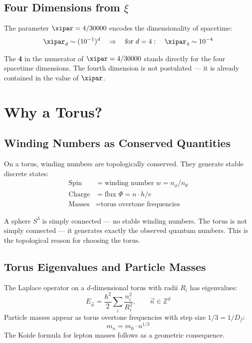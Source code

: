 \subsection{Four Dimensions from \texorpdfstring{$\xi$}{xi}}

The parameter $\xipar = 4/30000$ encodes the dimensionality of spacetime:
\begin{equation}
	\xipar_d \sim (10^{-1})^d \quad \Rightarrow \quad \text{for } d=4: \quad \xipar_4 \sim 10^{-4}
\end{equation}

\begin{keyresult}
The \textbf{4} in the numerator of $\xipar = 4/30000$ stands directly for the four spacetime dimensions. The fourth dimension is not postulated — it is already contained in the value of $\xipar$.
\end{keyresult}

\section{Why a Torus?}

\subsection{Winding Numbers as Conserved Quantities}

On a torus, winding numbers are topologically conserved. They generate stable discrete states:
\begin{align}
	\text{Spin} &= \text{winding number } w = n_\phi / n_\theta \\
	\text{Charge} &= \text{flux } \Phi = n \cdot h/e \\
	\text{Masses} &= \text{torus overtone frequencies}
\end{align}

\begin{keypoint}
A sphere $S^3$ is simply connected — no stable winding numbers. The torus is not simply connected — it generates exactly the observed quantum numbers. This is the topological reason for choosing the torus.
\end{keypoint}

\subsection{Torus Eigenvalues and Particle Masses}

The Laplace operator on a $d$-dimensional torus with radii $R_i$ has eigenvalues:
\begin{equation}
	E_{\vec{n}} = \frac{\hbar^2}{2} \sum_i \frac{n_i^2}{R_i^2}, \qquad \vec{n} \in \mathbb{Z}^d
\end{equation}
Particle masses appear as torus overtone frequencies with step size $1/3 = 1/D_f$:
\begin{equation}
	m_n = m_0 \cdot n^{1/3}
\end{equation}
The Koide formula for lepton masses follows as a geometric consequence.

